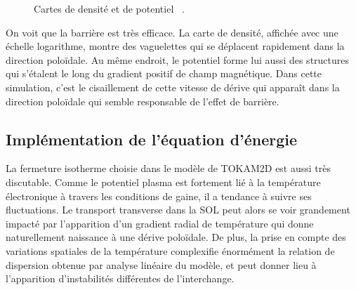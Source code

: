 \begin{refsection}
	\begin{figure}[!htbp]
    \centering
    \caption{Cartes de densité  et de potentiel
    ~.}
    \label{2-CartesMagBarrier}
\end{figure}

On voit que la barrière est très efficace. La carte de densité, affichée avec
une échelle logarithme, montre des vaguelettes qui se déplacent rapidement
dans la direction poloïdale.
Au même endroit, le potentiel forme lui aussi des structures qui s'étalent le
long du gradient positif de champ magnétique. 
Dans cette simulation, c'est le cisaillement de cette vitesse de dérive qui
apparaît dans la direction poloïdale qui semble responsable de l'effet de
barrière. 


	\subsection{Implémentation de l'équation d'énergie}
	La fermeture isotherme choisie dans le modèle de TOKAM2D est aussi très
	discutable. Comme le potentiel plasma est fortement lié à la température
	électronique à travers les conditions de gaine, il a tendance à suivre ses
	fluctuations. Le transport transverse dans la SOL peut alors se voir grandement
	impacté par l'apparition d'un gradient radial de température qui donne
	naturellement naissance à une dérive poloïdale. De plus, la prise en compte des
	variations spatiales de la température complexifie énormément la relation de
	dispersion obtenue par analyse linéaire du modèle, et peut donner lieu à
	l'apparition d'instabilités différentes de l'interchange\parencite{Berk}.
	

\end{refsection}
